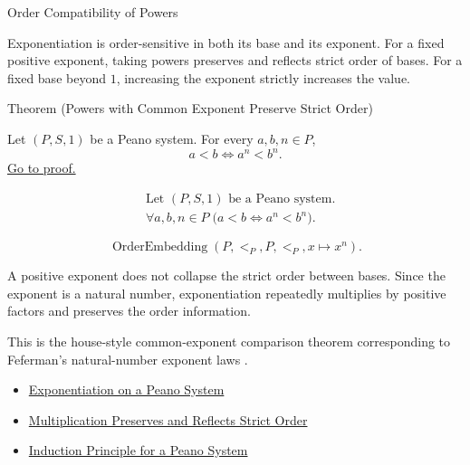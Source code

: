 \begin{topicbox}{Order Compatibility of Powers}
\begin{exposition}
Exponentiation is order-sensitive in both its base and its exponent. For a
fixed positive exponent, taking powers preserves and reflects strict order of
bases. For a fixed base beyond $1$, increasing the exponent strictly increases
the value.
\end{exposition}

\begin{theorembox}{Theorem (Powers with Common Exponent Preserve Strict Order)}
\begin{theorem}
\label{thm:powers-with-common-exponent-preserve-strict-order}
Let $(P,S,1)$ be a Peano system. For every $a,b,n \in P$,
\[
a<b
\Longleftrightarrow
a^n<b^n.
\]
\hyperref[prf:powers-with-common-exponent-preserve-strict-order]{Go to proof.}
\end{theorem}
\end{theorembox}

\begin{remark*}
\[
\begin{aligned}
&\text{Let } (P,S,1) \text{ be a Peano system.}\\
&\forall a,b,n \in P\;\bigl(a<b \Longleftrightarrow a^n<b^n\bigr).
\end{aligned}
\]
\end{remark*}

\begin{remark*}
\[
\operatorname{OrderEmbedding}(P,<_{P},P,<_{P},x \mapsto x^n).
\]
\end{remark*}

\begin{remark*}[Interpretation]
A positive exponent does not collapse the strict order between bases. Since
the exponent is a natural number, exponentiation repeatedly multiplies by
positive factors and preserves the order information.


This is the house-style common-exponent comparison theorem corresponding to
Feferman's natural-number exponent laws \citep{FefermanNumberSystems1964}.
\end{remark*}

\begin{dependencies}
\begin{itemize}
  \item \hyperref[def:exponentiation-on-peano-system]{Exponentiation on a Peano System}
  \item \hyperref[thm:multiplication-preserves-and-reflects-strict-order]{Multiplication Preserves and Reflects Strict Order}
  \item \hyperref[thm:induction-principle-for-peano-system]{Induction Principle for a Peano System}
\end{itemize}
\end{dependencies}


\end{topicbox}
